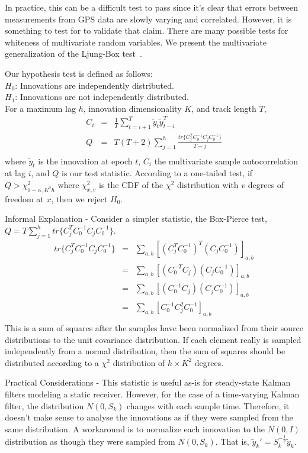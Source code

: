 \medskip
{} In practice, this can be a difficult test to pass since it's clear that errors between measurements from GPS data are slowly varying and correlated.  However, it is something to test for to validate that claim.  There are many possible tests for whiteness of multivariate random variables.  We present the multivariate generalization of the Ljung-Box test~\cite{1980}.

Our hypothesis test is defined as follows:\\
$H_0$: Innovations are independently distributed.\\
$H_1$: Innovations are not independently distributed.\\
For a maximum lag $h$, innovation dimensionality $K$, and track length $T$,
\begin{eqnarray*}
C_i &=& \frac{1}{T}\sum_{t=i+1}^T\tilde{y}_t\tilde{y}_{t-i}^T\\
Q &=& T(T+2)\sum_{j=1}^h \frac{tr\{C_j^T C_0^{-1} C_j C_0^{-1}\}}{T-j}\\
\end{eqnarray*}
where $\tilde{y}_t$ is the innovation at epoch $t$, $C_i$ the multivariate sample autocorrelation at lag $i$, and $Q$ is our test statistic.
According to a one-tailed test, if $Q > \chi^2_{1-\alpha,K^2h}$ where $\chi^2_{x,v}$ is the CDF of the $\chi^2$ distribution with $v$ degrees of freedom at $x$, then we reject $H_0$.

\medskip
\noindent Informal Explanation - Consider a simpler statistic, the Box-Pierce test, $Q = T \sum_{j=1}^h tr\{C_j^T C_0^{-1} C_j C_0^{-1}\}$.
\begin{eqnarray*}
tr\{C_j^T C_0^{-1} C_j C_0^{-1}\} &=& \sum_{a,b}[(C_j^T C_0^{-1})^T(C_j C_0^{-1})]_{a,b}\\
 &=& \sum_{a,b}[(C_0^{-T} C_j)(C_j C_0^{-1})]_{a,b}\\
 &=& \sum_{a,b}[(C_0^{-1} C_j)(C_j C_0^{-1})]_{a,b}\\
 &=& \sum_{a,b}[C_0^{-1} C_j^2 C_0^{-1}]_{a,b}\\
\end{eqnarray*}
This is a sum of squares after the samples have been normalized from their source distributions to the unit covariance distribution.  If each element really is sampled independently from a normal distribution, then the sum of squares should be distributed according to a $\chi^2$ distribution of $h \times K^2$ degrees.

\medskip
\noindent Practical Considerations - This statistic is useful as-is for steady-state Kalman filters modeling a static receiver.  However, for the case of a time-varying Kalman filter, the distribution $N(0,S_k)$ changes with each sample time.  Therefore, it doesn't make sense to analyse the innovations as if they were sampled from the same distribution.  A workaround is to normalize each innovation to the $N(0, I)$ distribution as though they were sampled from $N(0,S_k)$.  That is, $\tilde{y}_k' = S_k^{-\frac{1}{2}} \tilde{y}_k$.

